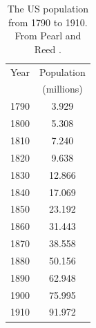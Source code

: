 \begin{table}[htbp]
\begin{center}
\begin{tabular}{cc}
Year & Population\\
& (millions) \\
\hline
1790 & 3.929 \\
1800 & 5.308 \\
1810 & 7.240 \\
1820 & 9.638 \\
1830 & 12.866 \\
1840 & 17.069 \\
1850 & 23.192 \\
1860 & 31.443 \\
1870 & 38.558 \\
1880 & 50.156 \\
1890 & 62.948 \\
1900 & 75.995 \\
1910 & 91.972 
\end{tabular}
\caption{The US population from 1790 to 1910. From Pearl and Reed
\cite{PearlReed1920}.}
\label{table:US_population_1790_1910}
\end{center}
\end{table}

